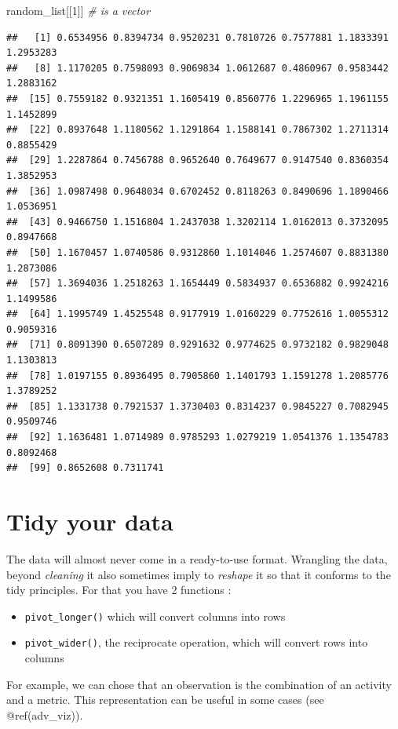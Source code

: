 \documentclass[
]{book}
\newenvironment{Shaded}{\begin{snugshade}}{\end{snugshade}}
\newcommand{\CommentTok}[1]{\textcolor[rgb]{0.56,0.35,0.01}{\textit{#1}}}
\newcommand{\DecValTok}[1]{\textcolor[rgb]{0.00,0.00,0.81}{#1}}
\newcommand{\NormalTok}[1]{#1}
\providecommand{\tightlist}{%
  \setlength{\itemsep}{0pt}\setlength{\parskip}{0pt}}
\begin{document}
\begin{Shaded}
\begin{Highlighting}[]
\NormalTok{random_list[[}\DecValTok{1}\NormalTok{]] }\CommentTok{# is a vector}
\end{Highlighting}
\end{Shaded}

\begin{verbatim}
##   [1] 0.6534956 0.8394734 0.9520231 0.7810726 0.7577881 1.1833391 1.2953283
##   [8] 1.1170205 0.7598093 0.9069834 1.0612687 0.4860967 0.9583442 1.2883162
##  [15] 0.7559182 0.9321351 1.1605419 0.8560776 1.2296965 1.1961155 1.1452899
##  [22] 0.8937648 1.1180562 1.1291864 1.1588141 0.7867302 1.2711314 0.8855429
##  [29] 1.2287864 0.7456788 0.9652640 0.7649677 0.9147540 0.8360354 1.3852953
##  [36] 1.0987498 0.9648034 0.6702452 0.8118263 0.8490696 1.1890466 1.0536951
##  [43] 0.9466750 1.1516804 1.2437038 1.3202114 1.0162013 0.3732095 0.8947668
##  [50] 1.1670457 1.0740586 0.9312860 1.1014046 1.2574607 0.8831380 1.2873086
##  [57] 1.3694036 1.2518263 1.1654449 0.5834937 0.6536882 0.9924216 1.1499586
##  [64] 1.1995749 1.4525548 0.9177919 1.0160229 0.7752616 1.0055312 0.9059316
##  [71] 0.8091390 0.6507289 0.9291632 0.9774625 0.9732182 0.9829048 1.1303813
##  [78] 1.0197155 0.8936495 0.7905860 1.1401793 1.1591278 1.2085776 1.3789252
##  [85] 1.1331738 0.7921537 1.3730403 0.8314237 0.9845227 0.7082945 0.9509746
##  [92] 1.1636481 1.0714989 0.9785293 1.0279219 1.0541376 1.1354783 0.8092468
##  [99] 0.8652608 0.7311741
\end{verbatim}

\hypertarget{tidy-your-data}{%
\section{Tidy your data}\label{tidy-your-data}}

The data will almost never come in a ready-to-use format. Wrangling the data, beyond \emph{cleaning} it also sometimes imply to \emph{reshape} it so that it conforms to the tidy principles. For that you have 2 functions :

\begin{itemize}
\tightlist
\item
  \texttt{pivot\_longer()} which will convert columns into rows
\item
  \texttt{pivot\_wider()}, the reciprocate operation, which will convert rows into columns
\end{itemize}

For example, we can chose that an observation is the combination of an activity and a metric. This representation can be useful in some cases (see @ref(adv\_viz)).
\end{document}
